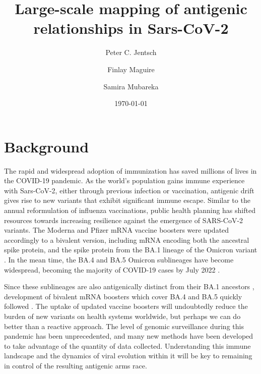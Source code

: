 \documentclass{article}
\title{Large-scale mapping of antigenic relationships in Sars-CoV-2}
\author[1,4]{Peter C. Jentsch}
\author[3,5]{Finlay Maguire}
\author[1,2]{Samira Mubareka}
\affil[1]{Sunnybrook Research Institute, Toronto, Canada}
\affil[2]{University of Toronto, Toronto, Canada}
\affil[3]{Dalhousie University, Halifax, Canada}
\affil[4]{Simon Fraser University, Burnaby, Canada}
\affil[5]{Shared Hospital Laboratory, Toronto, Canada}
\date{\today}
\begin{document}
\maketitle

\section{Background}

The rapid and widespread adoption of immunization has saved millions of lives in the COVID-19 pandemic.
As the world's population gains immune experience with Sars-CoV-2, either through previous infection or vaccination, antigenic drift gives rise to new variants that exhibit significant immune escape\cite{yewdellAntigenicDriftUnderstanding2021}.
Similar to the annual reformulation of influenza vaccinations, public health planning has shifted resources towards increasing resilience against the emergence of SARS-CoV-2 variants.
The Moderna and Pfizer mRNA vaccine boosters were updated accordingly to a bivalent version, including mRNA encoding both the ancestral spike protein, and the spike protein from the BA.1 lineage of the Omicron variant \cite{chalkias2022bivalent}.
In the mean time, the BA.4 and BA.5 Omicron sublineages have become widespread, becoming the majority of COVID-19 cases by July 2022 \cite{wilhelm2022early}.

Since these sublineages are also antigenically distinct from their BA.1 ancestors \cite{cao2022ba}, development of bivalent mRNA boosters which cover BA.4 and BA.5 quickly followed \cite{ba45pfizer}.
The uptake of updated vaccine boosters will undoubtedly reduce the burden of new variants on health systems worldwide, but perhaps we can do better than a reactive approach.
The level of genomic surveillance during this pandemic has been unprecedented, and many new methods have been developed to take advantage of the quantity of data collected.
Understanding this immune landscape and the dynamics of viral evolution within it will be key to remaining in control of the resulting antigenic arms race.
\end{document}
